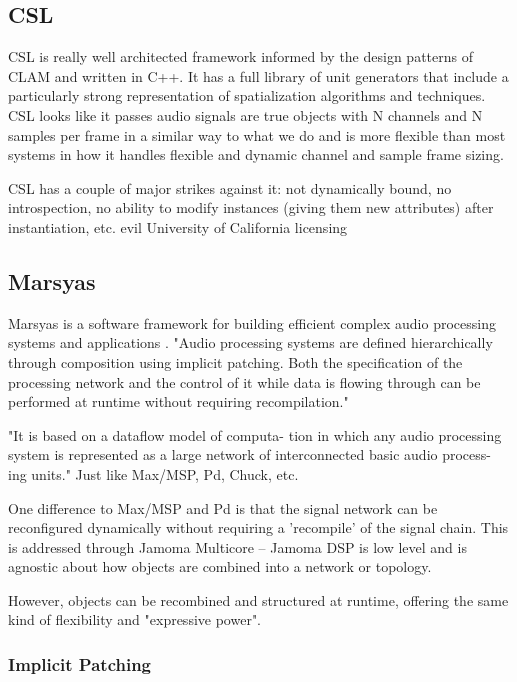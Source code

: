 \documentclass[twoside,10pt]{article}
\begin{document}

\subsection{CSL} %

CSL is really well architected framework informed by the design patterns of CLAM and written in C++\cite{Pope:2003,Pope:2006}.  It has a full library of unit generators that include a particularly strong representation of spatialization algorithms and techniques.  CSL looks like it passes audio signals are true objects with N channels and N samples per frame in a similar way to what we do and is more flexible than most systems in how it handles flexible and dynamic channel and sample frame sizing.

CSL has a couple of major strikes against it:   not dynamically bound, no introspection, no ability to modify instances (giving them new attributes) after instantiation, etc. evil University of California licensing


\subsection{Marsyas} %

Marsyas is a software framework for building efficient complex audio processing systems and applications \cite{Tzanetakis:2008}. "Audio processing systems are defined hierarchically through composition using implicit patching. Both the specification of the processing network and the control of it while data is flowing through can be performed at runtime without requiring recompilation."

"It is based on a dataflow model of computa- tion in which any audio processing system is represented as a large network of interconnected basic audio process- ing units."  Just like Max/MSP, Pd, Chuck, etc.

One difference to Max/MSP and Pd is that the signal network can be reconfigured dynamically without requiring a 'recompile' of the signal chain.  This is addressed through Jamoma Multicore -- Jamoma DSP is low level and is agnostic about how objects are combined into a network or topology.

However, objects can be recombined and structured at runtime, offering the same kind of flexibility and "expressive power".

\subsubsection{Implicit Patching}
\end{document}
